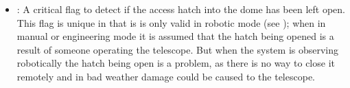 \begin{colsection}
\begin{colsection}
\begin{itemize}
    \item {}: A critical flag to detect if the access hatch into the dome has been left open. This flag is unique in that is is only valid in robotic mode (see ); when in manual or engineering mode it is assumed that the hatch being opened is a result of someone operating the telescope. But when the system is observing robotically the hatch being open is a problem, as there is no way to close it remotely and in bad weather damage could be caused to the telescope.
\end{itemize}

\end{colsection}


\end{colsection}


\newpage
